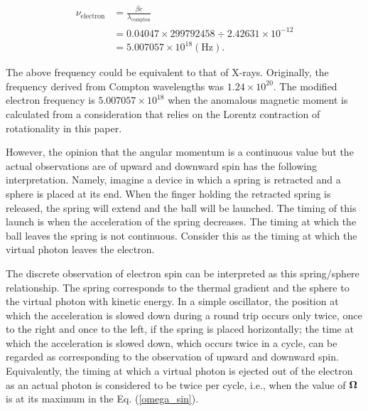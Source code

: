 \documentclass[%
 reprint,
 amsmath,amssymb,
 aps,
]{revtex4-1}
\numberwithin{equation}{section}%
\begin{document}
    \begin{equation}
        \begin{split}
            \nu_{\mathrm{electron}} 
                &= \frac{\beta c}{\lambda_{\mathrm{compton}}}  \\
                &= 0.04047 \times 299792458 \div 2.42631\times10^{-12} \\
                &= 5.007057 \times 10^{18} \mathrm{(Hz)}
                .
        \label{nu_electron}
        \end{split}
    \end{equation}


 The above frequency could be equivalent to that of X-rays. Originally, the frequency derived from Compton wavelengths was $1.24\times10^{20}$. The modified electron frequency is $5.007057\times10^{18}$ when the anomalous magnetic moment is calculated from a consideration that relies on the Lorentz contraction of rotationality in this paper.




However, the opinion that the angular momentum is a continuous value but the actual observations are of upward and downward spin has the following interpretation. Namely, imagine a device in which a spring is retracted and a sphere is placed at its end. When the finger holding the retracted spring is released, the spring will extend and the ball will be launched. The timing of this launch is when the acceleration of the spring decreases. The timing at which the ball leaves the spring is not continuous. Consider this as the timing at which the virtual photon leaves the electron.

The discrete observation of electron spin can be interpreted as this spring/sphere relationship. The spring corresponds to the thermal gradient and the sphere to the virtual photon with kinetic energy. In a simple oscillator, the position at which the acceleration is slowed down during a round trip occurs only twice, once to the right and once to the left, if the spring is placed horizontally; the time at which the acceleration is slowed down, which occurs twice in a cycle, can be regarded as corresponding to the observation of upward and downward spin. Equivalently, the timing at which a virtual photon is ejected out of the electron as an actual photon is considered to be twice per cycle, i.e., when the value of ${\bf \Omega}$ is at its maximum in the Eq. (\ref{omega_sin}).
\end{document}
